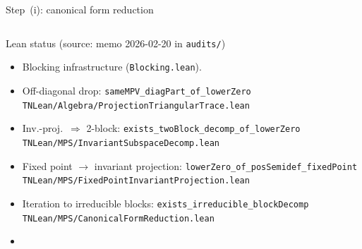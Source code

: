 \documentclass[aspectratio=169,10pt]{beamer}
\begin{document}
\begin{frame}{Step~(i): canonical form reduction~\cite{Cirac2017Annals,Cirac2021Matrix}}
\begin{columns}[T]
        \begin{block}{Lean status \textnormal{\scriptsize(source: memo 2026-02-20 in \texttt{audits/})}}
            \begin{itemize}\itemsep0.10em
                \item[\textcolor{leangreen}{\checkmark}]
                      Blocking infrastructure
                      (\texttt{Blocking.lean}).
                \item[\textcolor{leangreen}{\checkmark}]
                      Off-diagonal drop:
                      \texttt{sameMPV\_diagPart\_of\_lowerZero}\\
                      {\scriptsize\textcolor{dimwhite}{\texttt{TNLean/Algebra/ProjectionTriangularTrace.lean}}}
                \item[\textcolor{leangreen}{\checkmark}]
                      Inv.-proj.\ $\Rightarrow$ 2-block:
                      \texttt{exists\_twoBlock\_decomp\_of\_lowerZero}\\
                      {\scriptsize\textcolor{dimwhite}{\texttt{TNLean/MPS/InvariantSubspaceDecomp.lean}}}
                \item[\textcolor{leangreen}{\checkmark}]
                      Fixed point $\to$ invariant projection:
                      \texttt{lowerZero\_of\_posSemidef\_fixedPoint}\\
                      {\scriptsize\textcolor{dimwhite}{\texttt{TNLean/MPS/FixedPointInvariantProjection.lean}}}
                \item[\textcolor{leangreen}{\checkmark}]
                      Iteration to irreducible blocks:
                      \texttt{exists\_irreducible\_blockDecomp}\\
                      {\scriptsize\textcolor{dimwhite}{\texttt{TNLean/MPS/CanonicalFormReduction.lean}}}%
                      ~\cite{Cirac2017Annals,Cirac2017Irreducible}
                \item[\textcolor{leangreen}{\checkmark}]

\end{itemize}
\end{block}
\end{columns}
\end{frame}
\end{document}
